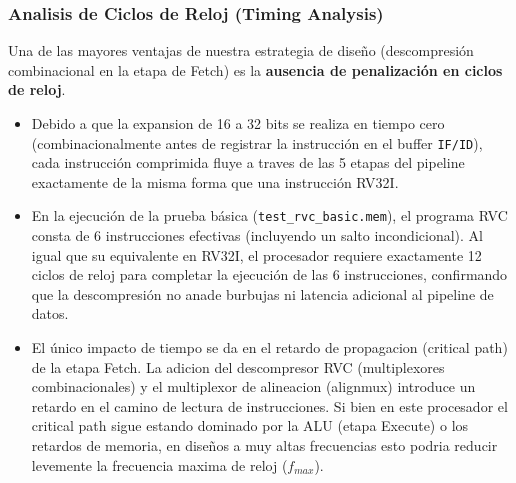 \documentclass[12pt, a4paper]{article}
\begin{document}
\subsubsection{Analisis de Ciclos de Reloj (Timing Analysis)}
Una de las mayores ventajas de nuestra estrategia de diseño (descompresión combinacional en la etapa de Fetch) es la \textbf{ausencia de penalización en ciclos de reloj}. 
\begin{itemize}
    \item Debido a que la expansion de 16 a 32 bits se realiza en tiempo cero (combinacionalmente antes de registrar la instrucción en el buffer \texttt{IF/ID}), cada instrucción comprimida fluye a traves de las 5 etapas del pipeline exactamente de la misma forma que una instrucción RV32I.
    \item En la ejecución de la prueba básica (\texttt{test\_rvc\_basic.mem}), el programa RVC consta de 6 instrucciones efectivas (incluyendo un salto incondicional). Al igual que su equivalente en RV32I, el procesador requiere exactamente 12 ciclos de reloj para completar la ejecución de las 6 instrucciones, confirmando que la descompresión no anade burbujas ni latencia adicional al pipeline de datos.
    \item El único impacto de tiempo se da en el retardo de propagacion (critical path) de la etapa Fetch. La adicion del descompresor RVC (multiplexores combinacionales) y el multiplexor de alineacion (alignmux) introduce un retardo en el camino de lectura de instrucciones. Si bien en este procesador el critical path sigue estando dominado por la ALU (etapa Execute) o los retardos de memoria, en diseños a muy altas frecuencias esto podria reducir levemente la frecuencia maxima de reloj ($f_{max}$).
\end{itemize}
\end{document}
